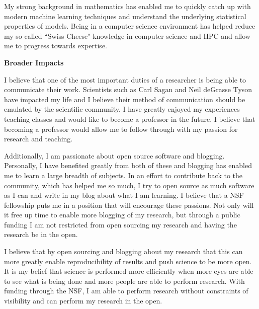 \documentclass[12pt]{article}
\begin{document}
My strong background in mathematics has enabled me to quickly catch up with
modern machine learning techniques and understand the underlying statistical
properties of models. Being in a computer science environment has helped reduce
my so called ``Swiss Cheese" knowledge in computer science and HPC and allow me 
to progress towards expertise. 

\textbf{Broader Impacts}
%

I believe that one of the most important duties of a researcher is being able to
communicate their work. Scientists such as Carl Sagan and Neil deGrasse Tyson
have impacted my life and I believe their method of communication should be
emulated by the scientific community. I have greatly enjoyed my experiences
teaching classes and would like to become a professor in the future. I believe
that becoming a professor would allow me to follow through with my passion for
research and teaching. 

Additionally, I am passionate about open source software and blogging.
Personally, I have benefited greatly from both of these and blogging has enabled
me to learn a large breadth of subjects. In an effort to contribute back to the
community, which has helped me so much, I try to open source as much software as
I can and write in my blog about what I am learning. I believe that a NSF
fellowship puts me in a position that will encourage these passions. Not only
will it free up time to enable more blogging of my research, but through a
public funding I am not restricted from open sourcing my research and having the
research be in the open.

I believe that by open sourcing and blogging about my research that this can
more greatly enable reproducibility of results and push science to be more open.
It is my belief that science is performed more efficiently when more eyes are
able to see what is being done and more people are able to perform research.
With funding through the NSF, I am able to perform research without constraints
of visibility and can perform my research in the open.

%
\end{document}
